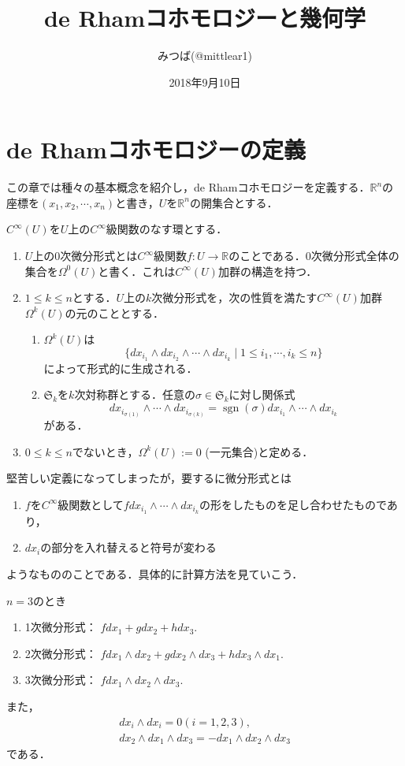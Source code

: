 \documentclass[uplatex]{jsarticle}
\begin{document}
\title{de Rhamコホモロジーと幾何学}
\author{みつば(@mittlear1)}
\date{2018年9月10日}
\maketitle

\section{de Rhamコホモロジーの定義}
この章では種々の基本概念を紹介し，de Rhamコホモロジーを定義する．$\mathbb{R}^n$の座標を$(x_1,x_2,\cdots,x_n)$と書き，$U$を$\mathbb{R}^n$の開集合とする．
\begin{definition}[微分形式]
$C^{\infty}(U)$を$U$上の$C^{\infty}$級関数のなす環とする．
\begin{enumerate}[label=(\arabic*)]
\item $U$上の0次微分形式とは$C^{\infty}$級関数$f\colon U\rightarrow\mathbb{R}$のことである．0次微分形式全体の集合を$\Omega^0(U)$と書く．これは$C^{\infty}(U)$加群の構造を持つ．
\item $1\le k\le n$とする．$U$上の$k$次微分形式を，次の性質を満たす$C^{\infty}(U)$加群$\Omega^k(U)$の元のこととする．
  \begin{enumerate}
  \item $\Omega^k(U)$は
  \[ \{dx_{i_1} \wedge dx_{i_2} \wedge \cdots \wedge dx_{i_k}\mid 1\le i_1, \cdots, i_k\le n\} \]
  によって形式的に生成される．
  \item $\mathfrak{S}_k$を$k$次対称群とする．任意の$\sigma\in \mathfrak{S}_k$に対し関係式
  \[ dx_{i_{\sigma(1)}}\wedge\cdots\wedge dx_{i_{\sigma(k)}}= \operatorname{sgn}(\sigma)dx_{i_1}\wedge\cdots\wedge dx_{i_k} \]
  がある．
  \end{enumerate}
\item $0\le k\le n$でないとき，$\Omega^k(U):=0$ (一元集合)と定める．
\end{enumerate}
\end{definition}
堅苦しい定義になってしまったが，要するに微分形式とは
\begin{enumerate}
\item $f$を$C^{\infty}$級関数として$fdx_{i_1}\wedge\cdots\wedge dx_{i_k}$の形をしたものを足し合わせたものであり，
\item $dx_i$の部分を入れ替えると符号が変わる
\end{enumerate}
ようなもののことである．具体的に計算方法を見ていこう．
\begin{example}
$n=3$のとき
\begin{enumerate}[label=(\arabic*)]
\item 1次微分形式： $fdx_1+gdx_2+hdx_3.$
\item 2次微分形式： $fdx_1\wedge dx_2+gdx_2\wedge dx_3+hdx_3\wedge dx_1.$
\item 3次微分形式： $fdx_1\wedge dx_2\wedge dx_3.$
\end{enumerate}
また，
\begin{gather*}
 dx_i\wedge dx_i=0 \left(i=1,2,3\right), \\
 dx_2\wedge dx_1\wedge dx_3=-dx_1\wedge dx_2\wedge dx_3
\end{gather*}
である．
\end{example}
\end{document}

